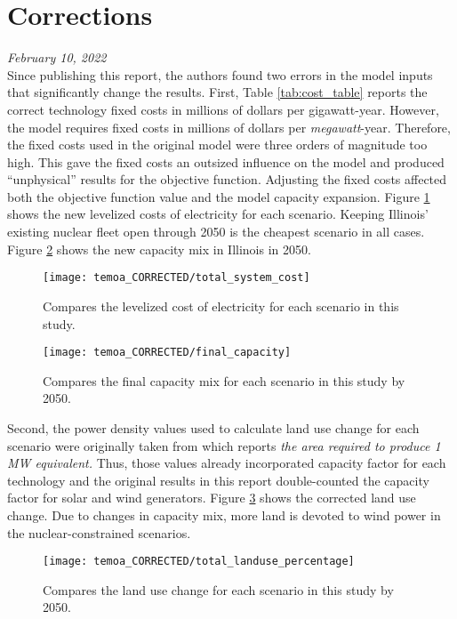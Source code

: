 \section*{Corrections}

\textit{February 10, 2022} \\

Since publishing this report, the authors found two errors in the model inputs
that significantly change the results. First, Table \ref{tab:cost_table} reports
the correct technology fixed costs in millions of dollars per gigawatt-year.
However, the model requires fixed costs in millions of dollars per \textit{megawatt}-year.
Therefore, the fixed costs used in the original model were three orders of
magnitude too high. This gave the fixed costs an outsized influence on the model
and produced ``unphysical'' results for the objective function. Adjusting
the fixed costs affected both the objective function value and the model capacity
expansion. Figure \ref{fig:system_cost} shows the new levelized costs of
electricity for each scenario. Keeping Illinois' existing nuclear fleet open
through 2050 is the cheapest scenario in all cases. Figure \ref{fig:correct_capacity_2050}
shows the new capacity mix in Illinois in 2050.

\begin{figure}[H]
  \texttt{[image: temoa\_CORRECTED/total\_system\_cost]}
  \caption{Compares the levelized cost of electricity for each scenario in this
  study.}
  \label{fig:system_cost}
\end{figure}

\begin{figure}[H]
  \texttt{[image: temoa\_CORRECTED/final\_capacity]}
  \caption{Compares the final capacity mix for each scenario in this
  study by 2050.}
  \label{fig:correct_capacity_2050}
\end{figure}

Second, the power density values used to calculate land use change for each
scenario were originally taken from \cite{van_zalk_spatial_2018} which reports
\textit{the area required to produce 1 MW equivalent.} Thus, those values
already incorporated capacity factor for each technology and the original
results in this report double-counted the capacity factor for solar and wind
generators. Figure \ref{fig:landuse_correct} shows the corrected land use change.
Due to changes in capacity mix, more land is devoted to wind power in the nuclear-constrained
scenarios.

\begin{figure}[H]
  \texttt{[image: temoa\_CORRECTED/total\_landuse\_percentage]}
  \caption{Compares the land use change for each scenario in this
  study by 2050.}
  \label{fig:landuse_correct}
\end{figure}


